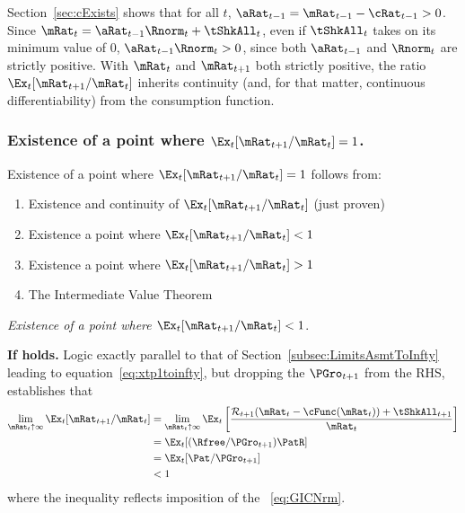 \documentclass[\econtexRoot/BufferStockTheory]{subfiles}
\begin{document}
Section~\ref{sec:cExists} shows that for all $t$, $\aRat_{t-1} = {\mRat}_{t-1} -  \cRat_{t-1} > 0$.  Since ${\mRat}_{t}= {\aRat}_{t-1} \Rnorm_{t} + \tShkAll_{t}$, even if $\tShkAll_{t}$ takes on its minimum value of 0, $\aRat_{t-1} \Rnorm_{t} > 0$, since both $\aRat_{t-1}$ and $\Rnorm_{t}$ are strictly positive.  With $\mRat_{t}$ and $\mRat_{t+1}$ both strictly positive, the ratio $\Ex_t [{\mRat}_{t+1}/\mRat_t]$ inherits continuity (and, for that matter, continuous differentiability) from the consumption function.

\subsubsection{Existence of a point where
  \texorpdfstring{$\Ex_t [{\mRat}_{t+1}/\mRat_t]=1$}
  {Ex-t[mRat-{t+1}/mRat-{t}]=1}.}

Existence of a point where $\Ex_t [{\mRat}_{t+1}/\mRat_t] = 1$ follows from:
\begin{enumerate}
\item Existence and continuity of $\Ex_t [{\mRat}_{t+1}/\mRat_t]$ (just proven)
  \item Existence a point where $\Ex_t [{\mRat}_{t+1}/\mRat_t] < 1$
  \item Existence a point where $\Ex_t [{\mRat}_{t+1}/\mRat_t] > 1$
    \item The Intermediate Value Theorem
    \end{enumerate}

\noindent    \textit{Existence of a point where $\Ex_t [{\mRat}_{t+1}/\mRat_t] < 1$}.
    
\textbf{If {\RIC} holds.}  Logic exactly parallel to that of Section~\ref{subsec:LimitsAsmtToInfty} leading to equation~\eqref{eq:xtp1toinfty}, but dropping the $\PGro_{t+1}$ from the RHS, establishes that
\begin{equation}\begin{gathered}\begin{aligned}
  \lim_{\mRat_{t} \uparrow \infty} \Ex_{t}[{\mRat}_{t+1}/\mRat_{t}]  & =   
                                                                       \lim_{\mRat_{t} \uparrow \infty} 
                                                                       \Ex_{t}\left[\frac{{\mathcal{\mathcal{R}}}_{t+1}(\mRat_{t}-\cFunc(\mRat_{t}))+{\tShkAll}_{t+1}}{\mRat_{t}}\right] \notag 
  \\  & = \Ex_{t}[(\Rfree/{\PGro}_{t+1})\PatR]  \notag
  \\  & = \Ex_{t}[{\Pat}/{\PGro}_{t+1}]  \label{eq:emgro}
  \\  & < 1 \notag
\end{aligned}\end{gathered}\end{equation}
where the inequality reflects imposition of the \GICNrm~\eqref{eq:GICNrm}.
\end{document}
